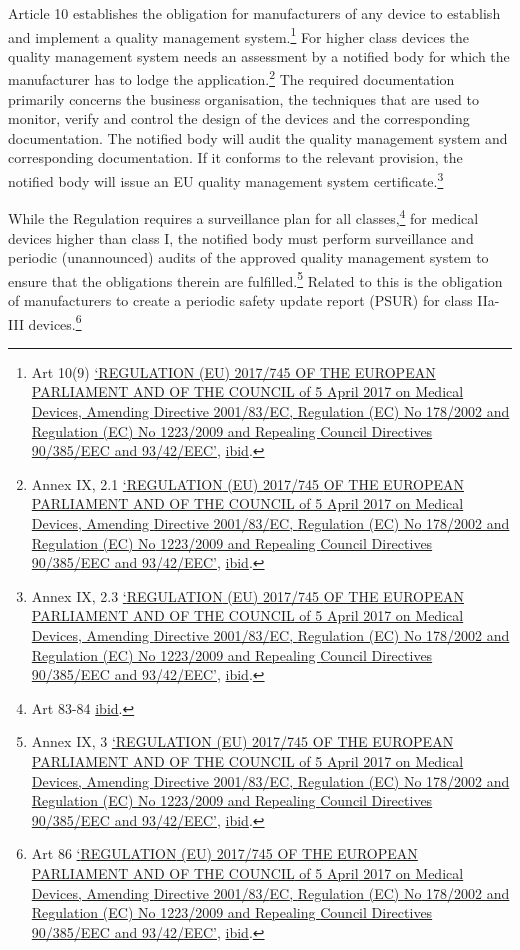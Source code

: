 \documentclass[
]{scrartcl}
\begin{document}
Article 10 establishes the obligation for manufacturers of any device to establish and implement a quality management system.\footnote{Art 10(9) \protect\hyperlink{ref-REGULATIONEU2017a}{{`{REGULATION} ({EU}) 2017/745 {OF THE EUROPEAN PARLIAMENT AND OF THE COUNCIL} of 5 {April} 2017 on Medical Devices, Amending {Directive} 2001/83/{EC}, {Regulation} ({EC}) {No} 178/2002 and {Regulation} ({EC}) {No} 1223/2009 and Repealing {Council Directives} 90/385/{EEC} and 93/42/{EEC}'}}, \protect\hyperlink{ref-REGULATIONEU2017a}{ibid}.} For higher class devices the quality management system needs an assessment by a notified body for which the manufacturer has to lodge the application.\footnote{Annex IX, 2.1 \protect\hyperlink{ref-REGULATIONEU2017a}{{`{REGULATION} ({EU}) 2017/745 {OF THE EUROPEAN PARLIAMENT AND OF THE COUNCIL} of 5 {April} 2017 on Medical Devices, Amending {Directive} 2001/83/{EC}, {Regulation} ({EC}) {No} 178/2002 and {Regulation} ({EC}) {No} 1223/2009 and Repealing {Council Directives} 90/385/{EEC} and 93/42/{EEC}'}}, \protect\hyperlink{ref-REGULATIONEU2017a}{ibid}.} The required documentation primarily concerns the business organisation, the techniques that are used to monitor, verify and control the design of the devices and the corresponding documentation. The notified body will audit the quality management system and corresponding documentation. If it conforms to the relevant provision, the notified body will issue an EU quality management system certificate.\footnote{Annex IX, 2.3 \protect\hyperlink{ref-REGULATIONEU2017a}{{`{REGULATION} ({EU}) 2017/745 {OF THE EUROPEAN PARLIAMENT AND OF THE COUNCIL} of 5 {April} 2017 on Medical Devices, Amending {Directive} 2001/83/{EC}, {Regulation} ({EC}) {No} 178/2002 and {Regulation} ({EC}) {No} 1223/2009 and Repealing {Council Directives} 90/385/{EEC} and 93/42/{EEC}'}}, \protect\hyperlink{ref-REGULATIONEU2017a}{ibid}.}

While the Regulation requires a surveillance plan for all classes,\footnote{Art 83-84 \protect\hyperlink{ref-REGULATIONEU2017a}{ibid}.} for medical devices higher than class I, the notified body must perform surveillance and periodic (unannounced) audits of the approved quality management system to ensure that the obligations therein are fulfilled.\footnote{Annex IX, 3 \protect\hyperlink{ref-REGULATIONEU2017a}{{`{REGULATION} ({EU}) 2017/745 {OF THE EUROPEAN PARLIAMENT AND OF THE COUNCIL} of 5 {April} 2017 on Medical Devices, Amending {Directive} 2001/83/{EC}, {Regulation} ({EC}) {No} 178/2002 and {Regulation} ({EC}) {No} 1223/2009 and Repealing {Council Directives} 90/385/{EEC} and 93/42/{EEC}'}}, \protect\hyperlink{ref-REGULATIONEU2017a}{ibid}.} Related to this is the obligation of manufacturers to create a periodic safety update report (PSUR) for class IIa-III devices.\footnote{Art 86 \protect\hyperlink{ref-REGULATIONEU2017a}{{`{REGULATION} ({EU}) 2017/745 {OF THE EUROPEAN PARLIAMENT AND OF THE COUNCIL} of 5 {April} 2017 on Medical Devices, Amending {Directive} 2001/83/{EC}, {Regulation} ({EC}) {No} 178/2002 and {Regulation} ({EC}) {No} 1223/2009 and Repealing {Council Directives} 90/385/{EEC} and 93/42/{EEC}'}}, \protect\hyperlink{ref-REGULATIONEU2017a}{ibid}.}
\end{document}
